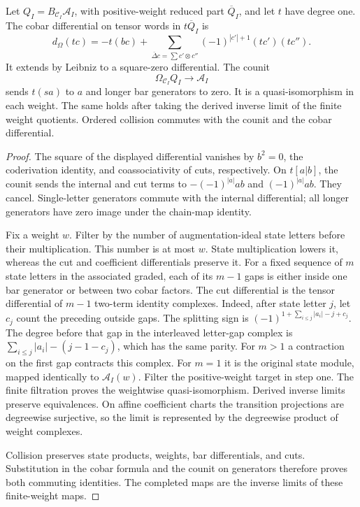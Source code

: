 \begin{proposition}
\label{prop:native-collision-cobar}
Let $Q_I=B_{\mathcal C_I}\mathcal A_I$, with positive-weight
reduced part $\overline Q_I$, and let $t$ have degree one.
The cobar differential on tensor words in $t\overline Q_I$ is
\[
 d_\Omega(tc)=-t(bc)+
 \sum_{\overline\Delta c=\sum c'\otimes c''}
       (-1)^{|c'|+1}(tc')(tc'').
\]
It extends by Leibniz to a square-zero differential. The counit
\[
 \Omega_{\mathcal C_I}Q_I\longrightarrow\mathcal A_I
\]
sends $t(sa)$ to $a$ and longer bar generators to zero.
It is a quasi-isomorphism in each weight. The same holds after
taking the derived inverse limit of the finite weight quotients.
Ordered collision commutes with the counit and the cobar differential.
\end{proposition}
\begin{proof}
The square of the displayed differential vanishes by $b^2=0$,
the coderivation identity, and coassociativity of cuts, respectively.
On $t[a|b]$, the counit sends the internal and cut terms to
$-(-1)^{|a|}ab$ and $(-1)^{|a|}ab$. They cancel.
Single-letter generators commute with the internal differential;
all longer generators have zero image under the chain-map identity.

Fix a weight $w$. Filter by the number of augmentation-ideal
state letters before their multiplication. This number is at most
$w$. State multiplication lowers it, whereas the cut and coefficient
differentials preserve it. For a fixed sequence of $m$ state letters
in the associated graded, each of its $m-1$ gaps is either inside
one bar generator or between two cobar factors. The cut differential
is the tensor differential of $m-1$ two-term identity complexes.
Indeed, after state letter $j$, let $c_j$ count the preceding
outside gaps. The splitting sign is
$(-1)^{1+\sum_{i\le j}|a_i|-j+c_j}$.
The degree before that gap in the interleaved letter-gap complex
is $\sum_{i\le j}|a_i|-(j-1-c_j)$, which has the same parity.
For $m>1$ a contraction on the first gap contracts this complex.
For $m=1$ it is the original state module, mapped identically to
$\mathcal A_I(w)$. Filter the positive-weight target in step one.
The finite filtration proves the weightwise quasi-isomorphism.
Derived inverse limits preserve equivalences. On affine coefficient
charts the transition projections are degreewise surjective, so the
limit is represented by the degreewise product of weight complexes.

Collision preserves state products, weights, bar differentials, and
cuts. Substitution in the cobar formula and the counit on generators
therefore proves both commuting identities. The completed maps
are the inverse limits of these finite-weight maps.
\end{proof}

